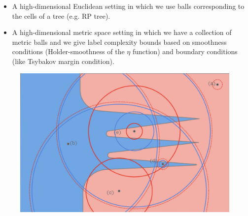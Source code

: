 \documentclass{article}
\begin{document}
\begin{itemize}
\item A high-dimensional Euclidean setting in which we use balls
corresponding to the cells of a tree (e.g. RP tree).

\item A high-dimensional metric space setting in which we have a
collection of metric balls and we give label complexity bounds based
on smoothness conditions (Holder-smoothness of the $\eta$ function)
and boundary conditions (like Tsybakov margin condition).

\end{itemize}


\begin{figure}
\begin{center}
\includegraphics[width=6in]{IMG_0840.jpg}
\end{center}


\end{figure}
\end{document}
